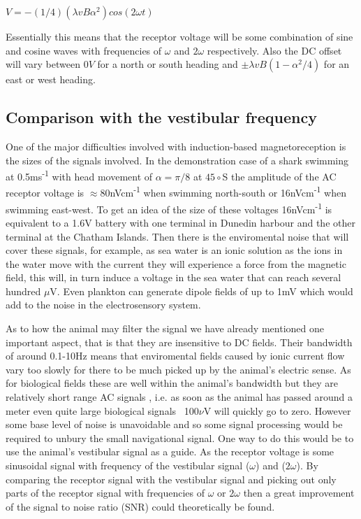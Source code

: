 \documentclass[12pt]{article}
\begin{document}
\vspace{4mm}

$V = -(1/4)(\lambda vB\alpha ^2)cos(2\omega t)$  

\vspace{4mm}

Essentially this means that the receptor voltage will be some combination of sine and cosine waves with frequencies of $\omega$ and $2\omega$ respectively. Also the DC offset will vary between $0V$ for a north or south heading and $\pm \lambda vB(1 - \alpha ^2/4)$ for an east or west heading. 

\subsection{Comparison with the vestibular frequency}

One of the major difficulties involved with induction-based magnetoreception is the sizes of the signals involved. In the demonstration case of a shark swimming at 0.5ms\textsuperscript{-1} with head movement of $\alpha = \pi /8$ at $45\circ$S the amplitude of the AC receptor voltage is $\approx 80$nVcm\textsuperscript{-1} when swimming north-south or 16nVcm\textsuperscript{-1} when swimming east-west. To get an idea of the size of these voltages 16nVcm\textsuperscript{-1} is equivalent to a 1.6V battery with one terminal in Dunedin harbour and the other terminal at the Chatham Islands. Then there is the enviromental noise that will cover these signals, for example, as sea water is an ionic solution as the ions in the water move with the current they will experience a force from the magnetic field, this will, in turn induce a voltage in the sea water that can reach several hundred $\mu$V. Even plankton can generate dipole fields of up to 1mV which would add to the noise in the electrosensory system. 

As to how the animal may filter the signal we have already mentioned one important aspect, that is that they are insensitive to DC fields. Their bandwidth of around 0.1-10Hz\cite{Montgomery:1994} means that enviromental fields caused by ionic current flow vary too slowly for there to be much picked up by the animal's electric sense. As for biological fields these are well within the animal's bandwidth but they are relatively short range AC signals \cite{Camperi:2007}, i.e. as soon as the animal has passed around a meter even quite large biological signals ~100$\nu$V will quickly go to zero. However some base level of noise is unavoidable and so some signal processing would be required to unbury the small navigational signal. One way to do this would be to use the animal's vestibular signal as a guide. As the receptor voltage is some sinusoidal signal with frequency of the vestibular signal ($\omega$) and ($2\omega$). By comparing the receptor signal with the vestibular signal and picking out only parts of the receptor signal with frequencies of $\omega$ or $2\omega$ then a great improvement of the signal to noise ratio (SNR) could theoretically be found\cite{Paulin:1995}\cite{Molteno:2009}.
\end{document}
